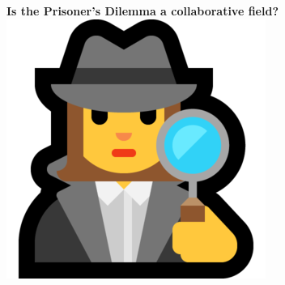 \documentclass{beamer}
\begin{document}
\begin{frame}
    \begin{center}
        
    \end{center}
\end{frame}



    



\begin{frame}
    \begin{center}
        \LARGE{\textbf{Is the Prisoner's Dilemma a collaborative field?}} \\ \vspace{.6cm}
        \includegraphics[width=.15\textwidth]{static/detective.png} \\ \vspace{.5cm}
    \end{center}
\end{frame}
\end{document}
